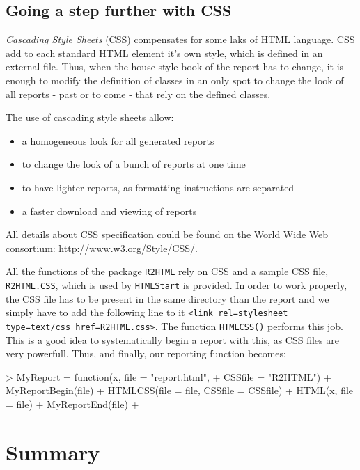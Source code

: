 \documentclass[a4paper]{article}
\newcommand{\HTML}{{\tt R2HTML}}
\begin{document}
\subsection*{Going a step further with CSS}

{\it Cascading Style Sheets} (CSS) compensates for some laks of HTML language. CSS add to each standard HTML element it's own style, which is defined in an external file. Thus, when the house-style book of the report has to change, it is enough to modify the definition of classes in an only spot to change the look of all reports - past or to come - that rely on the defined classes.

The use of cascading style sheets allow:
\begin{itemize}
\item a homogeneous look for all generated reports
\item to change the look of a bunch of reports at one time
\item to have lighter reports, as formatting instructions are separated
\item a faster download and viewing of reports
\end{itemize}

All details about CSS specification could be found on the World Wide Web consortium: \href{http://www.w3.org/Style/CSS/}{http://www.w3.org/Style/CSS/}.

All the functions of the package \HTML{} rely on CSS and a sample CSS file, \verb+R2HTML.CSS+, which is used by \verb+HTMLStart+ is provided. In order to work properly, the CSS file has to be present in the same directory than the report and we simply have to add the following line to it {\tt <link rel=stylesheet type=text/css href=R2HTML.css>}. The function \verb+HTMLCSS()+ performs this job. This is a good idea to systematically begin a report with this, as CSS files are very powerfull. Thus, and finally, our reporting function becomes:

\begin{Schunk}
\begin{Sinput}
> MyReport = function(x, file = "report.html", 
+     CSSfile = "R2HTML") {
+     MyReportBegin(file)
+     HTMLCSS(file = file, CSSfile = CSSfile)
+     HTML(x, file = file)
+     MyReportEnd(file)
+ }
\end{Sinput}
\end{Schunk}

\section*{Summary}
\end{document}
